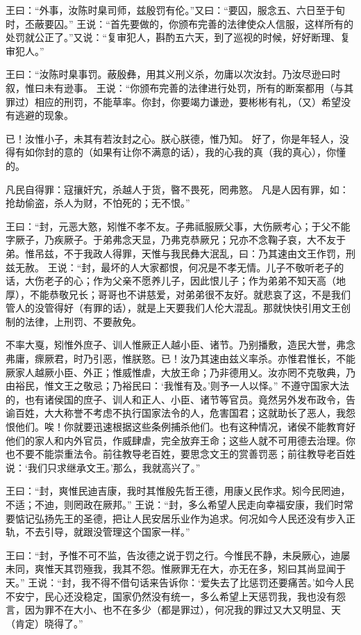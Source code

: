 \documentclass[12pt,UTF8]{ctexbook}
\begin{document}
王曰：“外事，汝陈时臬司师，兹殷罚有伦。”又曰：“要囚，服念五、六日至于旬时，丕蔽要囚。”
王说：“首先要做的，你颁布完善的法律使众人信服，这样所有的处罚就公正了。”又说：“复审犯人，斟酌五六天，到了巡视的时候，好好断理、复审犯人。”

王曰：“汝陈时臬事罚。蔽殷彝，用其义刑义杀，勿庸以次汝封。乃汝尽逊曰时叙，惟曰未有逊事。
王说：“你颁布完善的法律进行处罚，所有的断案都用（与其罪过）相应的刑罚，不能草率。你封，你要竭力谦逊，要彬彬有礼，（又）希望没有逃避的现象。

已！汝惟小子，未其有若汝封之心。朕心朕德，惟乃知。
好了，你是年轻人，没得有如你封的意的（如果有让你不满意的话），我的心我的真（我的真心），你懂的。

凡民自得罪：寇攘奸宄，杀越人于货，暋不畏死，罔弗憝。
凡是人因有罪，如：抢劫偷盗，杀人为财，不怕死的；无不恨。”

王曰：“封，元恶大憝，矧惟不孝不友。子弗祗服厥父事，大伤厥考心；于父不能字厥子，乃疾厥子。于弟弗念天显，乃弗克恭厥兄；兄亦不念鞠子哀，大不友于弟。惟吊兹，不于我政人得罪，天惟与我民彝大泯乱，曰：乃其速由文王作罚，刑兹无赦。
王说：“封，最坏的人大家都恨，何况是不孝无情。儿子不敬听老子的话，大伤老子的心；作为父亲不愿养儿子，因此恨儿子；作为弟弟不知天高（地厚），不能恭敬兄长；哥哥也不讲慈爱，对弟弟很不友好。就悲哀了这，不是我们管人的没管得好（有罪的话），就是上天要我们人伦大混乱。那就快快引用文王创制的法律，上刑罚、不要赦免。

不率大戛，矧惟外庶子、训人惟厥正人越小臣、诸节。乃别播敷，造民大誉，弗念弗庸，瘝厥君，时乃引恶，惟朕憝。已！汝乃其速由兹义率杀。亦惟君惟长，不能厥家人越厥小臣、外正；惟威惟虐，大放王命；乃非德用乂。汝亦罔不克敬典，乃由裕民，惟文王之敬忌；乃裕民曰：‘我惟有及。’则予一人以怿。”
不遵守国家大法的，也有诸侯国的庶子、训人和正人、小臣、诸节等官员。竟然另外发布政令，告谕百姓，大大称誉不考虑不执行国家法令的人，危害国君；这就助长了恶人，我怨恨他们。唉！你就要迅速根据这些条例捕杀他们。也有这种情况，诸侯不能教育好他们的家人和内外官员，作威肆虐，完全放弃王命；这些人就不可用德去治理。你也不要不能崇重法令。前往教导老百姓，要思念文王的赏善罚恶；前往教导老百姓说：‘我们只求继承文王。’那么，我就高兴了。”

王曰：“封，爽惟民迪吉康，我时其惟殷先哲王德，用康乂民作求。矧今民罔迪，不适；不迪，则罔政在厥邦。”
王说：“封，多么希望人民走向幸福安康，我们时常要惦记弘扬先王的圣德，把让人民安居乐业作为追求。何况如今人民还没有步入正轨，不去引导，就跟没管理这个国家一样。”

王曰：“封，予惟不可不监，告汝德之说于罚之行。今惟民不静，未戾厥心，迪屡未同，爽惟天其罚殛我，我其不怨。惟厥罪无在大，亦无在多，矧曰其尚显闻于天。”
王说：“封，我不得不借句话来告诉你：‘爱失去了比惩罚还要痛苦。’如今人民不安宁，民心还没稳定，国家仍然没有统一，多么希望上天惩罚我，我也没有怨言，因为罪不在大小、也不在多少（都是罪过），何况我的罪过又大又明显、天（肯定）晓得了。”
\end{document}
